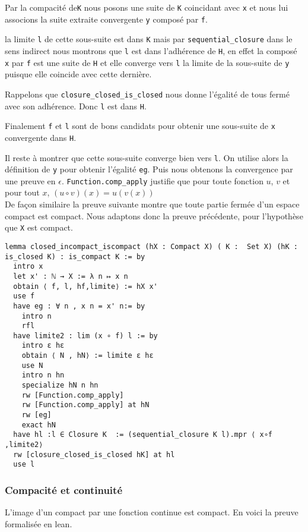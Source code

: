 \documentclass[a4paper, 12pt]{article}
\newcommand{\lean}[1]{\texttt{#1}}
\begin{document}
Par la compacité de\lean{K} nous posons une suite de \lean{K} coincidant avec \lean{x} et nous lui associons la suite extraite convergente \lean{y} composé par \lean{f}.

la limite \lean{l} de cette sous-suite est dans \lean{K} mais par \lean{sequential_closure} dans le sens indirect nous montrons que \lean{l} est dans l'adhérence de \lean{H}, en effet la composé \lean{x} par \lean{f} est une suite de \lean{H} et elle converge vers \lean{l} la limite de la sous-suite de \lean{y} puisque elle coincide avec cette dernière.

Rappelons que \lean{closure_closed_is_closed} nous donne l'égalité de tous fermé avec son adhérence. Donc \lean{l} est dans \lean{H}.

Finalement \lean{f} et \lean{l} sont de bons candidats pour obtenir une sous-suite de \lean{x} convergente dans \lean{H}.

Il reste à montrer que cette sous-suite converge bien vers \lean{l}. On utilise alors la définition de \lean{y} pour obtenir l'égalité \lean{eg}. Puis nous obtenons la convergence par une preuve en $\epsilon$. \lean{Function.comp_apply} justifie que pour toute fonction $u$, $v$ et pour tout $x$, $(u \circ v) (x) = u(v(x)) $ \\

De façon similaire la preuve suivante montre que toute partie fermée d'un espace compact est compact. Nous adaptons donc la preuve précédente, pour l'hypothèse que \lean{X} est compact.

\begin{verbatim}
lemma closed_incompact_iscompact (hX : Compact X) ( K :  Set X) (hK : is_closed K) : is_compact K := by
  intro x
  let x' : ℕ → X := λ n ↦ x n
  obtain ⟨ f, l, hf,limite⟩ := hX x'
  use f 
  have eg : ∀ n , x n = x' n:= by
    intro n
    rfl
  have limite2 : lim (x ∘ f) l := by
    intro ε hε 
    obtain ⟨ N , hN⟩ := limite ε hε 
    use N 
    intro n hn
    specialize hN n hn
    rw [Function.comp_apply]
    rw [Function.comp_apply] at hN
    rw [eg]
    exact hN
  have hl :l ∈ Closure K  := (sequential_closure K l).mpr ⟨ x∘f ,limite2⟩ 
  rw [closure_closed_is_closed hK] at hl
  use l
\end{verbatim}


\subsubsection{Compacité et continuité}

L'image d'un compact par une fonction continue est compact. En voici la preuve formalisée en lean.
\end{document}
